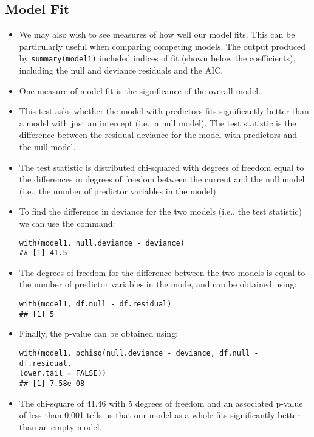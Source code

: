 \documentclass[]{article}
\begin{document}
\subsection{Model Fit}
\begin{itemize}
\item We may also wish to see measures of how well our model fits. This can be particularly useful when comparing competing models. The output produced by \texttt{summary(model1)} included indices of fit (shown below the coefficients), including the null and deviance residuals and the AIC. 
\item One measure of model fit is the significance of the overall model. 
\item This test asks whether the model with predictors fits significantly better than a model with just an intercept (i.e., a null model). The test statistic is the difference between the residual deviance for the model with predictors and the null model. 
\item The test statistic is distributed chi-squared with degrees of freedom equal to the differences in degrees of freedom between the current and the null model (i.e., the number of predictor variables in the model). 
\item To find the difference in deviance for the two models (i.e., the test statistic) we can use the command:

\begin{framed}
\begin{verbatim}
with(model1, null.deviance - deviance)
## [1] 41.5
\end{verbatim}
\end{framed}
\item The degrees of freedom for the difference between the two models is equal to the number of predictor variables in the mode, and can be obtained using:
\begin{framed}
\begin{verbatim}
with(model1, df.null - df.residual)
## [1] 5
\end{verbatim}
\end{framed}
\item Finally, the p-value can be obtained using:
\begin{framed}
\begin{verbatim}
with(model1, pchisq(null.deviance - deviance, df.null - df.residual, 
lower.tail = FALSE))
## [1] 7.58e-08
\end{verbatim}
\end{framed}


\item The chi-square of 41.46 with 5 degrees of freedom and an associated p-value of less than 0.001 tells us that our model as a whole fits significantly better than an empty model. 
\end{itemize}
\end{document}

